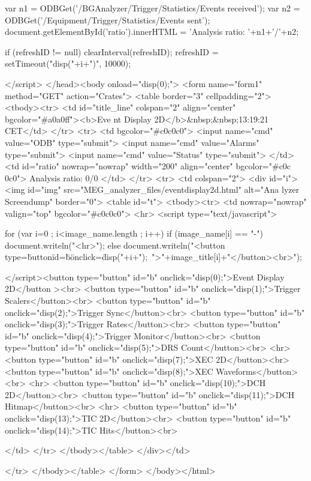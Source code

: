 \begin{DoxyCode}
{    var n1 = ODBGet('/BGAnalyzer/Trigger/Statistics/Events received');
    var n2 = ODBGet('/Equipment/Trigger/Statistics/Events sent');
    document.getElementById('ratio').innerHTML = 'Analysis ratio: '+n1+'/'+n2;

    if (refreshID != null)
      clearInterval(refreshID);
    refreshID = setTimeout("disp("+i+")", 10000);
  }
  
  </script>
  </head><body onload="disp(0);">
    <form name="form1" method="GET" action="Crates">
      <table border="3" cellpadding="2">
        <tbody><tr>
          <td id="title_line" colspan="2" align="center" bgcolor="#a0a0ff"><b>Eve
      nt Display 2D</b>&nbsp;&nbsp;13:19:21  CET</td>
        </tr>
        <tr>
          <td bgcolor="#c0c0c0">
            <input name="cmd" value="ODB" type="submit">
            <input name="cmd" value="Alarms" type="submit">
            <input name="cmd" value="Status" type="submit">
          </td>
          <td id="ratio" nowrap="nowrap" width="200" align="center" bgcolor="#c0c
      0c0">
            Analysis ratio: 0/0
          </td>
        </tr>  
        <tr>
          <td colspan="2">
            <div id="i">
              <img id="img" src="MEG_analyzer_files/eventdisplay2d.html" alt="Ana
      lyzer Screendump" border="0">
              <table id="t">
                <tbody><tr>
                  <td nowrap="nowrap" valign="top" bgcolor="#c0c0c0">
                    <hr>
<script type="text/javascript">

  for (var i=0 ; i<image_name.length ; i++)
    if (image_name[i] == "-")
       document.writeln("<hr>");
    else
       document.writeln("<button type=\"button\" id=\"b\" onclick=\"disp("+i+");\
      ">"+image_title[i]+"</button><br>");

</script><button type="button" id="b" onclick="disp(0);">Event Display 2D</button
      ><br>
<button type="button" id="b" onclick="disp(1);">Trigger Scalers</button><br>
<button type="button" id="b" onclick="disp(2);">Trigger Sync</button><br>
<button type="button" id="b" onclick="disp(3);">Trigger Rates</button><br>
<button type="button" id="b" onclick="disp(4);">Trigger Monitor</button><br>
<button type="button" id="b" onclick="disp(5);">DRS Count</button><br>
<hr>
<button type="button" id="b" onclick="disp(7);">XEC 2D</button><br>
<button type="button" id="b" onclick="disp(8);">XEC Waveforms</button><br>
<hr>
<button type="button" id="b" onclick="disp(10);">DCH 2D</button><br>
<button type="button" id="b" onclick="disp(11);">DCH Hitmap</button><br>
<hr>
<button type="button" id="b" onclick="disp(13);">TIC 2D</button><br>
<button type="button" id="b" onclick="disp(14);">TIC Hits</button><br>

                  </td>
                </tr>
              </tbody></table>
            </div></td>
          
        </tr>
      </tbody></table>
    </form>
  </body></html>
\end{DoxyCode}


\label{index_end}
\hypertarget{index_end}{}
  